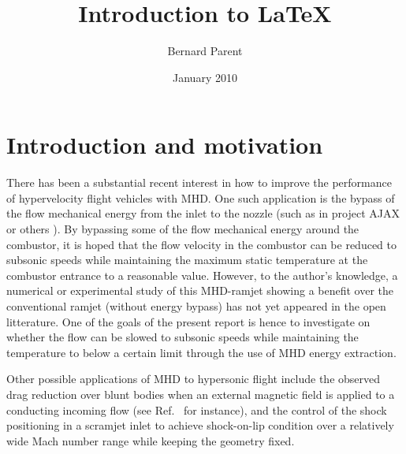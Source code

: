 \documentclass[oneside,10pt,onecolumn]{waflreport}
\author{
  Bernard Parent
}
\title{
  Introduction to \LaTeX
}
\date{
  January 2010
}
\begin{document}
  \pagestyle{headings}
  \setcounter{page}{1}
  \makewaflreporttitle
  \makeabstract
  \tableofcontents
  \makenomenclature




























\section{Introduction and motivation}

There has been a substantial recent interest in how to
improve the performance of hypervelocity flight vehicles with MHD. One such application
is the bypass of the flow mechanical energy from the inlet to the nozzle (such as in
project AJAX \cite{aiaaconf:1996:gurijanov,aiaaconf:2001:kuranov} or
others \cite{aiaabook:2001:vatazhin,jpp:2001:litchford}).
By bypassing some of the flow mechanical energy around the combustor, it is hoped
that the flow velocity in the combustor can be reduced to subsonic speeds while
maintaining the maximum static temperature at the combustor entrance to a reasonable
value. However, to the author's knowledge, a numerical or experimental study of this MHD-ramjet
showing a benefit over the conventional ramjet (without energy bypass) has not yet
appeared in the open litterature. One of the goals of the present report is hence to
investigate on whether the flow can be slowed to subsonic speeds while maintaining
the temperature to below a certain limit through the use of MHD energy extraction.

Other
possible applications of MHD to hypersonic flight include the observed drag reduction
over blunt bodies when an external magnetic field is applied to a conducting incoming
flow (see Ref.\ \cite{aiaa:2002:shang} for instance), and the control of the shock positioning
in a scramjet inlet to achieve shock-on-lip condition over a relatively wide Mach number range
\cite{aiaaconf:2002:shneider} while keeping the geometry fixed.
\end{document}
